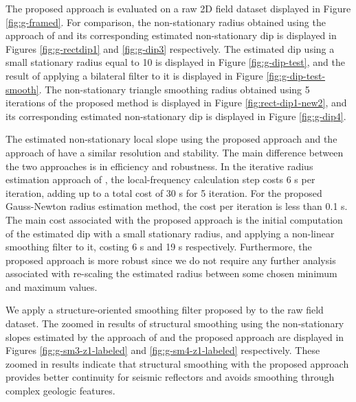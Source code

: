 The proposed approach is evaluated on a raw 2D field dataset displayed in Figure \ref{fig:g-framed}. 
For comparison, the non-stationary radius obtained using the approach of \cite{wang2021} and its corresponding estimated non-stationary dip is displayed in Figures \ref{fig:g-rectdip1} and \ref{fig:g-dip3} respectively. 
The estimated dip using a small stationary radius equal to 10 is displayed in Figure \ref{fig:g-dip-test}, and the result of applying a bilateral filter to it is displayed in Figure \ref{fig:g-dip-test-smooth}. 
The non-stationary triangle smoothing radius obtained using 5 iterations of the proposed method is displayed in Figure \ref{fig:rect-dip1-new2}, and its corresponding estimated non-stationary dip is displayed in Figure \ref{fig:g-dip4}.

The estimated non-stationary local slope using the proposed approach and the approach of \cite{wang2021} have a similar resolution and stability. 
The main difference between the two approaches is in efficiency and robustness. In the iterative radius estimation approach of \cite{wang2021}, the local-frequency calculation step costs 6 s per iteration, adding up to a total cost of 30 s for 5 iteration. For the proposed Gauss-Newton radius estimation method, the cost per iteration is less than 0.1 s. The main cost associated with the proposed approach is the initial computation of the estimated dip with a small stationary radius, and applying a non-linear smoothing filter to it, costing 6 s and 19 s respectively. 
Furthermore, the proposed approach is more robust since we do not require any further analysis associated with re-scaling the estimated radius between some chosen minimum and maximum values. 

We apply a structure-oriented smoothing filter proposed by \cite{chenetal2020} to the raw field dataset. The zoomed in results of structural smoothing using the non-stationary slopes estimated by the approach of \cite{wang2021} and the proposed approach are displayed in Figures \ref{fig:g-sm3-z1-labeled} and \ref{fig:g-sm4-z1-labeled} respectively. These zoomed in results indicate that structural smoothing with the proposed approach provides better continuity for seismic reflectors and avoids smoothing through complex geologic features. 


